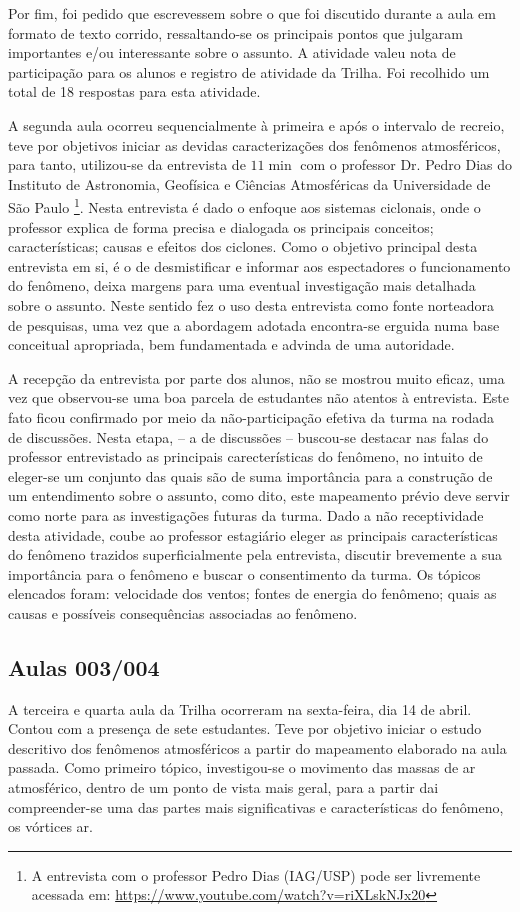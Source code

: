 Por fim, foi pedido que escrevessem sobre o que foi discutido durante a aula em formato de texto corrido, ressaltando-se os principais pontos que julgaram importantes e/ou interessante sobre o assunto. A atividade valeu nota de participação para os alunos e registro de atividade da Trilha. Foi recolhido um total de 18 respostas para esta atividade.

A segunda aula ocorreu sequencialmente à primeira e após o intervalo de recreio, teve por objetivos iniciar as devidas caracterizações dos fenômenos atmosféricos, para tanto, utilizou-se da entrevista de $11\min$ com o professor Dr. Pedro Dias do Instituto de Astronomia, Geofísica e Ciências Atmosféricas da Universidade de São Paulo \footnote{A entrevista com o professor Pedro Dias (IAG/USP) pode ser livremente acessada em: \url{https://www.youtube.com/watch?v=riXLskNJx20}}. Nesta entrevista é dado o enfoque aos sistemas ciclonais, onde o professor explica de forma precisa e dialogada os principais conceitos; características; causas e efeitos dos ciclones. Como o objetivo principal desta entrevista em si, é o de desmistificar e informar aos espectadores o funcionamento do fenômeno, deixa margens para uma eventual investigação mais detalhada sobre o assunto. Neste sentido fez o uso desta entrevista como fonte norteadora de pesquisas, uma vez que a abordagem adotada encontra-se erguida numa base conceitual apropriada, bem fundamentada e advinda de uma autoridade.

A recepção da entrevista por parte dos alunos, não se mostrou muito eficaz, uma vez que observou-se uma boa parcela de estudantes não atentos à entrevista. Este fato ficou confirmado por meio da não-participação efetiva da turma na rodada de discussões. Nesta etapa, -- a de discussões --  buscou-se destacar nas falas do professor entrevistado as principais carecterísticas do fenômeno, no intuito de eleger-se um conjunto das quais são de suma importância para a construção de um entendimento sobre o assunto, como dito, este mapeamento prévio deve servir como norte para as investigações futuras da turma. Dado a não receptividade desta atividade, coube ao professor estagiário eleger as principais características do fenômeno trazidos superficialmente pela entrevista, discutir brevemente a sua importância para o fenômeno e buscar o consentimento da turma. Os tópicos elencados foram: velocidade dos ventos; fontes de energia do fenômeno; quais as causas e possíveis consequências associadas ao fenômeno. 

\subsection{Aulas 003/004} %
\label{sub:Aulas 003/004}
A terceira e quarta aula da Trilha ocorreram na sexta-feira, dia 14 de abril. Contou com a presença de sete estudantes. Teve por objetivo iniciar o estudo descritivo dos fenômenos atmosféricos a partir do mapeamento elaborado na aula passada. Como primeiro tópico, investigou-se o movimento das massas de ar atmosférico, dentro de um ponto de vista mais geral, para a partir dai compreender-se uma das partes mais significativas e características do fenômeno, os vórtices ar.

